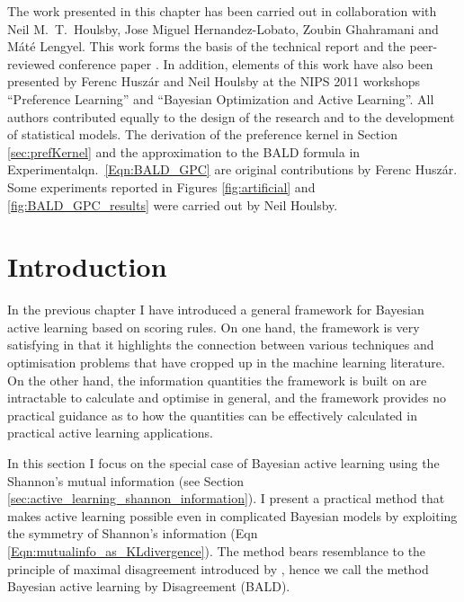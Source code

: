 

\begin{summarycontributions}
The work presented in this chapter has been carried out in collaboration with Neil M.\ T.\ Houlsby, Jose Miguel Hernandez-Lobato, Zoubin Ghahramani and M\'{a}t\'{e} Lengyel. This work forms the basis of the technical report \citep{Houlsby2011} and the peer-reviewed conference paper \citep{Houlsby2012preference}. In addition, elements of this work have also been presented by Ferenc Husz\'{a}r and Neil Houlsby at the NIPS 2011 workshops ``Preference Learning'' and ``Bayesian Optimization and Active Learning''. All authors contributed equally to the design of the research and to the development of statistical models. The derivation of the preference kernel in Section \eqref{sec:prefKernel} and the approximation to the BALD formula in Experimentalqn.\ \eqref{Eqn:BALD_GPC} are original contributions by Ferenc Husz\'{a}r. Some experiments reported in Figures \ref{fig:artificial} and \ref{fig:BALD_GPC_results} were carried out by Neil Houlsby.
\end{summarycontributions}

\section{Introduction}

In the previous chapter I have introduced a general framework for Bayesian active learning based on scoring rules. On one hand, the framework is very satisfying in that it highlights the connection between various techniques and optimisation problems that have cropped up in the machine learning literature. On the other hand, the information quantities the framework is built on are intractable to calculate and optimise in general, and the framework provides no practical guidance as to how the quantities can be effectively calculated in practical active learning applications.

In this section I focus on the special case of Bayesian active learning using the Shannon's mutual information (see Section \ref{sec:active_learning_shannon_information}). I present a practical method that makes active learning possible even in complicated Bayesian models by exploiting the symmetry of Shannon's information (Eqn \eqref{Eqn:mutualinfo_as_KLdivergence}). The method bears resemblance to the principle of maximal disagreement introduced by \citet{seung1992}, hence we call the method Bayesian active learning by Disagreement (BALD).

